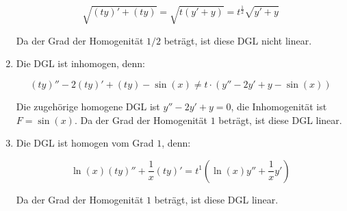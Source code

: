 \begin{enumerate}
$$\sqrt{(ty)'+(ty)} = \sqrt{t(y'+y)} = t^{\frac{1}{2}}\sqrt{y'+y}$$

Da der Grad der Homogenität $1/2$ beträgt, ist diese DGL nicht linear.

\item Die DGL ist inhomogen, denn:

$$ (ty)''-2(ty)'+(ty)-\sin(x) \ne t \cdot (y''-2y'+y-\sin(x)) $$

Die zugehörige homogene DGL ist $y''-2y'+y=0$, die Inhomogenität ist $F=\sin(x)$. Da der Grad der Homogenität $1$ beträgt, ist diese DGL linear.

\item Die DGL ist homogen vom Grad $1$, denn:

$$ \ln(x)(ty)''+ \frac{1}{x}(ty)' = t^1 (\ln(x)y''+\frac{1}{x}y') $$

Da der Grad der Homogenität $1$ beträgt, ist diese DGL linear.

\end{enumerate}

